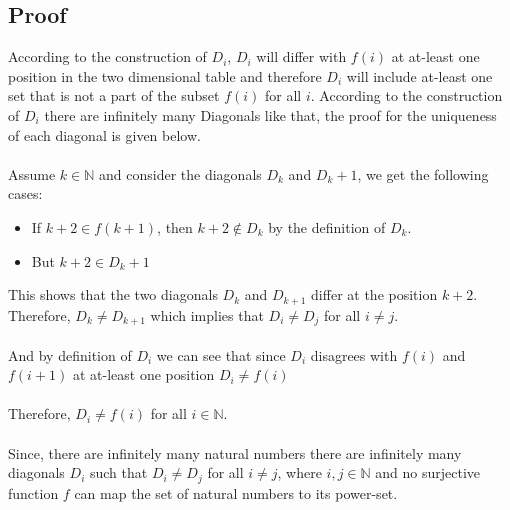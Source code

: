 \documentclass{article}
\begin{document}
\newpage
\subsection*{Proof}
According to the construction of $D_i$, $D_i$ will differ with $f(i)$ at at-least one position in the two dimensional table and therefore $D_i$ will include at-least one set that is not a part of the subset $f(i)$ for all $i$. According to the construction of $D_i$ there are infinitely many Diagonals like that, the proof for the uniqueness of each diagonal is given below.
\\
\\
Assume \( k \in \mathbb{N} \) and consider the diagonals $D_k$ and $D_k+1$, we get the following cases:

\begin{itemize}
\item If \( k+2 \in f(k + 1) \), then \( k+2 \notin D_k \) by the definition of \( D_k \).
\item But \( k+2 \in D_k+1 \)
\end{itemize}
\bigskip
This shows that the two diagonals $D_k$ and $D_{k+1}$ differ at the position $k+2$.
Therefore, \( D_k \neq D_{k+1} \) which implies that \( D_i \neq D_j \) for all \( i \neq j \).
\\
\\
And by definition of $D_i$ we can see that since $D_i$ disagrees with $f(i)$ and $f(i+1)$ at at-least one position $D_i \neq f(i)$
\\
\\
Therefore, \( D_i \neq f(i) \) for all \( i \in \mathbb{N} \).
\\
\\
Since, there are infinitely many natural numbers there are infinitely  many diagonals $D_i$ such that $D_i \neq D_j$ for all $i \neq j$, where $i,j \in \mathbb{N}$ and no surjective function $f$ can map the set of natural numbers to its power-set.



\end{document}
